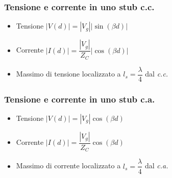 \documentclass{article}
\begin{document}
\subsubsection{Tensione e corrente in uno stub c.c.}
\begin{itemize}
		\item Tensione \( |V(d)| = \left| V_g \right| \left|\sin(\beta d)\right| \)
		\item Corrente \( |I(d)| = \dfrac{|V_g|}{Z_C} |\cos (\beta d) |\)
		\item Massimo di tensione localizzato a \( l_s = \dfrac{\lambda}{4} \) dal \textit{c.c.}
\end{itemize}

\subsubsection{Tensione e corrente in uno stub c.a.}
\begin{itemize}
	\item Tensione \( |V(d)| = \left|V_g\right| \cos(\beta d) \)
	\item Corrente \( |I(d)| = \dfrac{\left|V_g\right|}{Z_C} \cos(\beta d) \)
	\item Massimo di corrente localizzato a \(l_s =  \dfrac{\lambda}{4} \) dal \textit{c.a.}
\end{itemize}
\end{document}
